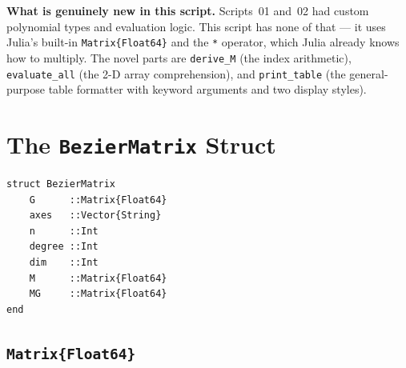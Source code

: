 \documentclass[12pt, a4paper]{article}
\newcommand{\cd}[1]{\texttt{#1}}
\begin{document}
\begin{center}
\end{center}

\bigskip
\begin{notebox}
\textbf{What is genuinely new in this script.}
Scripts~01 and~02 had custom polynomial types and evaluation logic.
This script has none of that --- it uses Julia's built-in
\cd{Matrix\{Float64\}} and the \cd{*} operator, which Julia
already knows how to multiply.
The novel parts are \cd{derive\_M} (the index arithmetic),
\cd{evaluate\_all} (the 2-D array comprehension), and
\cd{print\_table} (the general-purpose table formatter
with keyword arguments and two display styles).
\end{notebox}


\section{The \texttt{BezierMatrix} Struct}

\begin{verbatim}
struct BezierMatrix
    G      ::Matrix{Float64}
    axes   ::Vector{String}
    n      ::Int
    degree ::Int
    dim    ::Int
    M      ::Matrix{Float64}
    MG     ::Matrix{Float64}
end
\end{verbatim}

\subsection{\texttt{Matrix\{Float64\}}}
\end{document}
